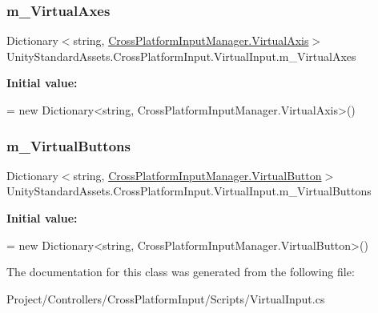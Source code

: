 \subsubsection{\texorpdfstring{m\+\_\+\+Virtual\+Axes}{m\_VirtualAxes}}
{\footnotesize\ttfamily Dictionary$<$string, \hyperlink{class_unity_standard_assets_1_1_cross_platform_input_1_1_cross_platform_input_manager_1_1_virtual_axis}{Cross\+Platform\+Input\+Manager.\+Virtual\+Axis}$>$ Unity\+Standard\+Assets.\+Cross\+Platform\+Input.\+Virtual\+Input.\+m\+\_\+\+Virtual\+Axes\hspace{0.3cm}{\ttfamily [protected]}}

{\bfseries Initial value\+:}
\begin{DoxyCode}
=
            \textcolor{keyword}{new} Dictionary<string, CrossPlatformInputManager.VirtualAxis>()
\end{DoxyCode}
\mbox{\label{class_unity_standard_assets_1_1_cross_platform_input_1_1_virtual_input_adbc824b5db08f6929aee3be874bc76cb}} 
\subsubsection{\texorpdfstring{m\+\_\+\+Virtual\+Buttons}{m\_VirtualButtons}}
{\footnotesize\ttfamily Dictionary$<$string, \hyperlink{class_unity_standard_assets_1_1_cross_platform_input_1_1_cross_platform_input_manager_1_1_virtual_button}{Cross\+Platform\+Input\+Manager.\+Virtual\+Button}$>$ Unity\+Standard\+Assets.\+Cross\+Platform\+Input.\+Virtual\+Input.\+m\+\_\+\+Virtual\+Buttons\hspace{0.3cm}{\ttfamily [protected]}}

{\bfseries Initial value\+:}
\begin{DoxyCode}
=
            \textcolor{keyword}{new} Dictionary<string, CrossPlatformInputManager.VirtualButton>()
\end{DoxyCode}


The documentation for this class was generated from the following file\+:\begin{DoxyCompactItemize}
\item 
Project/\+Controllers/\+Cross\+Platform\+Input/\+Scripts/Virtual\+Input.\+cs\end{DoxyCompactItemize}
